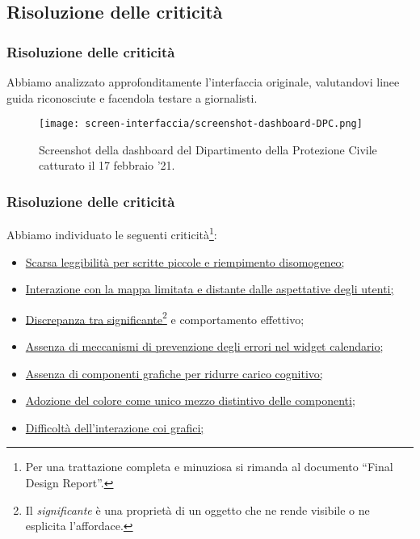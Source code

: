 \subsection{Risoluzione delle criticità}


\begin{frame}
    \frametitle{Risoluzione delle criticità}
    Abbiamo analizzato approfonditamente l'interfaccia originale, valutandovi linee guida riconosciute e facendola testare a giornalisti. 
    \begin{figure}
        \centering
        \texttt{[image: screen-interfaccia/screenshot-dashboard-DPC.png]}
        \caption{Screenshot della dashboard del Dipartimento della Protezione Civile catturato il 17 febbraio '21.}
    \end{figure}
\end{frame}

\begin{frame}
    \frametitle{Risoluzione delle criticità}
    Abbiamo individuato le seguenti criticità\footnote{Per una trattazione completa e minuziosa si rimanda al documento ``Final Design Report''.}: 
    \begin{itemize}
        \item<1-> \hyperlink{f:scarsa-leggibilita}{Scarsa leggibilità per scritte piccole e riempimento disomogeneo;}        
        \item<2-> \hyperlink{f:mappa}{Interazione con la mappa limitata e distante dalle aspettative degli utenti;}
        \item<3-> \hyperlink{f:significante}{Discrepanza tra significante\footnote{Il \textit{significante} è una proprietà di un oggetto che ne rende visibile o ne esplicita l'affordace.} e comportamento effettivo;}
        \item<4-> \hyperlink{f:errori}{Assenza di meccanismi di prevenzione degli errori nel widget calendario;}
        \item<5-> \hyperlink{f:grafica}{Assenza di componenti grafiche per ridurre carico cognitivo;}
        \item<6-> \hyperlink{f:colore}{Adozione del colore come unico mezzo distintivo delle componenti;}
        \item<7-> \hyperlink{f:difficolta}{Difficoltà dell'interazione coi grafici;}
    \end{itemize}    

\end{frame}

